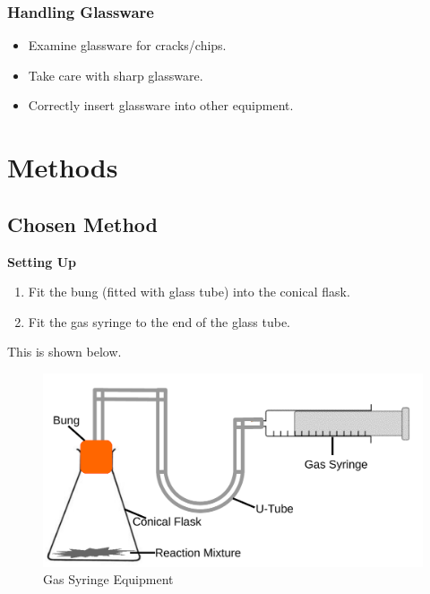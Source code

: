 \subsubsection{Handling Glassware}

\begin{itemize}
\item Examine glassware for cracks/chips.
\item Take care with sharp glassware.
\item Correctly insert glassware into other equipment.
\end{itemize}




\section{Methods}

	\subsection{Chosen Method} \label{Chosen Method}

\textbf{Setting Up}

\begin{enumerate}
\item Fit the bung (fitted with glass tube) into the conical flask.
\item Fit the gas syringe to the end of the glass tube.
\end{enumerate}


This is shown below.



\begin{figure}[H]
    \includegraphics[width=\textwidth]{./Planning/Images/GasSyringe.pdf}
    \caption{Gas Syringe Equipment} \label{fig:Gas Syringe}
\end{figure}

